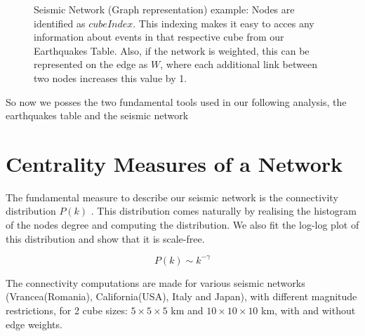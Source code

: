 \begin{figure}
\centering
{} 
\caption{Seismic Network (Graph representation) example: Nodes are identified as $cubeIndex$. This indexing makes it easy to acces any information about events in that respective cube from our Earthquakes Table. Also, if the network is weighted, this can be represented on the edge as $W$, where each additional link between two nodes increases this value by 1.}
\end{figure}

So now we posses the two fundamental tools used in our following analysis, the earthquakes table and the seismic network


\section{Centrality Measures of a Network}
The fundamental measure to describe our seismic network is the connectivity distribution $P(k)$ \cite{latora}. This distribution comes naturally by realising the histogram of the nodes degree and computing the distribution. We also fit the log-log plot of this distribution and show that it is scale-free.

\begin{equation}
P(k) \sim k^{-\gamma}
\end{equation}

The connectivity computations are made for various seismic networks (Vrancea(Romania), California(USA), Italy and Japan), with different magnitude restrictions, for 2 cube sizes: $5\times5\times5$ km and $10\times10\times10$ km, with and without edge weights.

\clearpage
